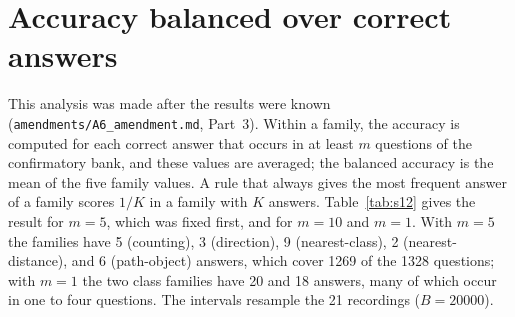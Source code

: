 \documentclass[10pt]{article}
\begin{document}
\section{Accuracy balanced over correct answers}
This analysis was made after the results were known (\texttt{amendments/A6\_amendment.md}, Part~3). Within a family, the accuracy is computed for each correct answer that occurs in at least $m$ questions of the confirmatory bank, and these values are averaged; the balanced accuracy is the mean of the five family values. A rule that always gives the most frequent answer of a family scores $1/K$ in a family with $K$ answers. Table~\ref{tab:s12} gives the result for $m=5$, which was fixed first, and for $m=10$ and $m=1$. With $m=5$ the families have 5 (counting), 3 (direction), 9 (nearest-class), 2 (nearest-distance), and 6 (path-object) answers, which cover 1269 of the 1328 questions; with $m=1$ the two class families have 20 and 18 answers, many of which occur in one to four questions. The intervals resample the 21 recordings ($B=20000$).
\end{document}
